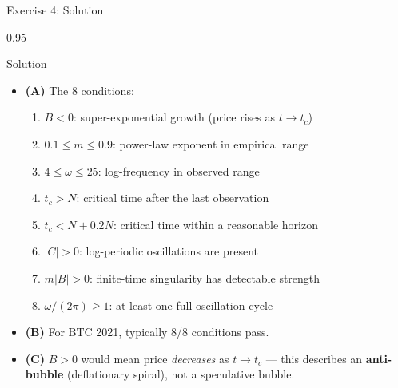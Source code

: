\documentclass[9pt, aspectratio=169, t]{beamer}
\begin{document}
\begin{frame}{Exercise 4: Solution}
    \begin{cminipage}{0.95\textwidth}
    \begin{exampleblock}{Solution}
        {\scriptsize
        \begin{itemize}\setlength{\itemsep}{2pt}
            \item \textcolor{MainBlue}{\textbf{(A)}} The 8 conditions:
            \begin{enumerate}\setlength{\itemsep}{0pt}
                \item $B < 0$: super-exponential growth (price rises as $t \to t_c$)
                \item $0.1 \leq m \leq 0.9$: power-law exponent in empirical range
                \item $4 \leq \omega \leq 25$: log-frequency in observed range
                \item $t_c > N$: critical time after the last observation
                \item $t_c < N + 0.2N$: critical time within a reasonable horizon
                \item $|C| > 0$: log-periodic oscillations are present
                \item $m|B| > 0$: finite-time singularity has detectable strength
                \item $\omega / (2\pi) \geq 1$: at least one full oscillation cycle
            \end{enumerate}
            \item \textcolor{MainBlue}{\textbf{(B)}} For BTC 2021, typically 8/8 conditions pass.
            \item \textcolor{MainBlue}{\textbf{(C)}} $B > 0$ would mean price \emph{decreases} as $t \to t_c$ --- this describes an \textbf{anti-bubble} (deflationary spiral), not a speculative bubble.
        \end{itemize}
        }
    \end{exampleblock}
    \end{cminipage}
\end{frame}
\end{document}
